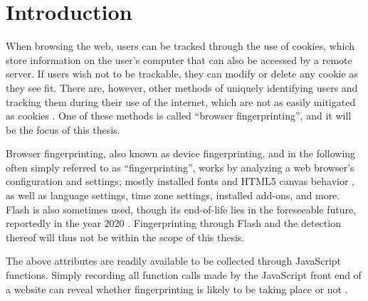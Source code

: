 \documentclass[
    fontsize=12pt,
    headings=small,
    parskip=half,
    bibliography=totoc,
    numbers=noenddot,
    open=any
    ]{scrreprt}
\begin{document}
\setcounter{tocdepth}{1}
\tableofcontents

\chapter{Introduction}
\label{chap:introduction}

When browsing the web, users can be tracked through the use of cookies, which store information on the user's computer
that can also be accessed by a remote server.
If users wish not to be trackable, they can modify or delete any cookie as they see fit.
There are, however, other methods of uniquely identifying users and tracking them during their use of the internet,
which are not as easily mitigated as cookies \cite{am_i_unique}. One of these methods is called ``browser fingerprinting'',
and it will be the focus of this thesis.

Browser fingerprinting, also known as device fingerprinting, and in the following often simply referred to as ``fingerprinting'',
works by analyzing a web browser's configuration and settings; mostly installed fonts and HTML5 canvas behavior
\cite{DBLP:conf/ccs/EnglehardtN16}, as well as
language settings, time zone settings, installed add-ons, and more. Flash is also sometimes used, though
its end-of-life lies in the foreseeable future, reportedly in the year
2020 \cite{flash_eol}.
Fingerprinting through Flash and the detection thereof will thus not be within the scope of this thesis.

The above attributes are readily available to be collected through JavaScript functions. Simply recording
all function calls made by the JavaScript front end of a website can reveal whether fingerprinting is likely to
be taking place or not \cite{faiz2014browser, panopticlick}.
\end{document}
